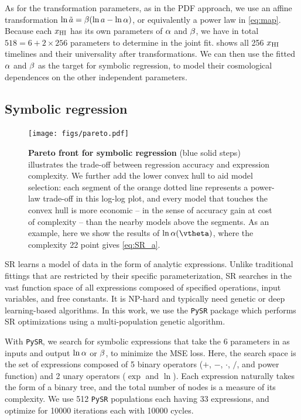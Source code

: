 As for the transformation parameters, as in the PDF approach, we use an
affine transformation $\ln\tilde{a} = \beta (\ln a - \ln\alpha)$, or equivalently
a power law in \cref{eq:map}.
Because each $x_{\mathrm{HI}}$ has its own parameters of $\alpha$ and $\beta$, we
have in total $518 = 6 + 2 \times 256$ parameters to determine in the
joint fit.
 shows all 256 $x_{\mathrm{HI}}$ timelines and their universality
after transformations.
We can then use the fitted $\alpha$ and $\beta$ as the target for symbolic
regression, to model their cosmological dependences on the other
independent parameters.


\subsection*{Symbolic regression}
\label{ssec:pysr}

\begin{figure}[tb]
\centering
\texttt{[image: figs/pareto.pdf]}
\caption{\textbf{Pareto front for symbolic regression} (blue solid
steps) illustrates the trade-off between regression accuracy and
expression complexity.
We further add the lower convex hull to aid model selection: each
segment of the orange dotted line represents a power-law trade-off in
this log-log plot, and every model that touches the convex hull is more
economic -- in the sense of accuracy gain at cost of complexity -- than
the nearby models above the segments.
As an example, here we show the results of $\ln\ap(\vtheta)$, where the
complexity 22 point gives \cref{eq:SR_a}.}
\label{fig:pareto}
\end{figure}

SR learns a model of data in the form of analytic expressions.
Unlike traditional fittings that are restricted by their specific
parameterization, SR searches in the vast function space of all
expressions composed of specified operations, input variables, and free
constants.
It is NP-hard \cite{SongEtAl2024, VirgolinPissis2022} and typically need
genetic or deep learning-based algorithms.
In this work, we use the \texttt{PySR} package \cite{Cranmer2020b,
Cranmer2023} which performs SR optimizations using a multi-population
genetic algorithm.

With \texttt{PySR}, we search for symbolic expressions that take the 6
parameters in  as inputs and output $\ln\alpha$ or $\beta$,
to minimize the MSE loss.
Here, the search space is the set of expressions composed of 5 binary
operators ($+$, $-$, $\cdot$, $/$, and power function) and 2 unary
operators ($\exp$ and $\ln$).
Each expression naturally takes the form of a binary tree, and the
total number of nodes is a measure of its complexity.
We use 512 \texttt{PySR} populations each having 33 expressions, and
optimize for 10000 iterations each with 10000 cycles.

